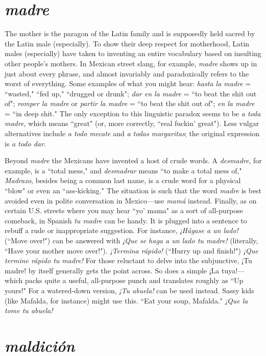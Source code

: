 \section{\emph{madre}}

The mother is the paragon of the Latin family and is supposedly held sacred by the Latin male (especially). To show their deep respect for motherhood, Latin males (especially) have taken to inventing an entire vocabulary based on insulting other people's mothers. In
Mexican street slang, for example, \emph{madre} shows up in just about every
phrase, and almost invariably and paradoxically refers to the worst of
everything. Some examples of what you might hear: \emph{hasta la madre} =
``wasted," ``fed up," ``drugged or drunk"; \emph{dar en la madre} = ``to beat
the shit out of"; \emph{romper la madre} or \emph{partir la madre} = ``to beat the
shit out of"; \emph{en la madre} = ``in deep shit." The only exception to this
linguistic paradox seems to be \emph{a toda madre,} which means ``great" (or,
more correctly, ``real fuckin' great"). Less vulgar alternatives include
\emph{a todo mecate} and \emph{a todas margaritas}; the original expression is \emph{a todo dar}.

Beyond \emph{madre} the Mexicans have invented a host of crude
words. A \emph{desmadre}, for example, is a ``total mess," and \emph{desmadrar}
means ``to make a total mess of," \emph{Madrazo}, besides being a common
last name, is a crude word for a physical ``blow" or even an ``ass-kicking." The situation is such that the word \emph{madre} is best avoided
even in polite conversation in Mexico---use \emph{mamá} instead. Finally, as
on certain U.S. streets where you may hear ``yo' mama" as a sort of all-purpose comeback, in Spanish \emph{tu madre} can be handy. It is plugged
into a sentence to rebuff a rude or inappropriate suggestion. For instance, \emph{¡Hágase a un lado!} (``Move over!") can be answered with \emph{¡Que
se haga a un lado tu madre!} (literally, ``Have your mother move over!").
\emph{¡Termina rápido!} (``Hurry up and finish!") \emph{¡Que termine rápido tu
madre!} For those reluctant to delve into the subjunctive, ¡Tu madre!
by itself generally gets the point across. So does a simple ¡La tuya!--- which packs quite a useful, all-purpose punch and translates roughly
as ``Up yours!" For a watered-down version, \emph{¡Tu abuela!} can be used
instead. Sassy kids (like Mafalda, for instance) might use this. ``Eat
your soup, Mafalda." \emph{¡Que la tome tu abuela!}

\section{\emph{maldición}}

